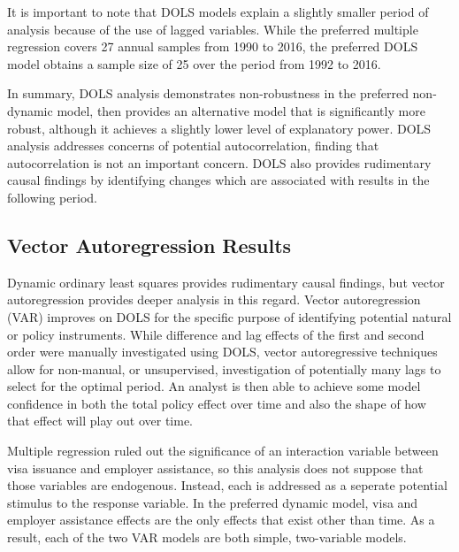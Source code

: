 \documentclass[review]{elsarticle}
\begin{document}
    It is important to note that DOLS models explain a slightly smaller period of analysis because of the use of lagged variables.
    While the preferred multiple regression covers 27 annual samples from 1990 to 2016,
    the preferred DOLS model obtains a sample size of 25 over the period from 1992 to 2016.

    In summary, DOLS analysis demonstrates non-robustness in the preferred non-dynamic model,
    then provides an alternative model that is significantly more robust, although it
    achieves a slightly lower level of explanatory power.
    DOLS analysis addresses concerns of potential autocorrelation,
    finding that autocorrelation is not an important concern.
    DOLS also provides rudimentary causal findings by identifying changes which are associated with results in the following period.

    \subsection{Vector Autoregression Results}

    Dynamic ordinary least squares provides rudimentary causal findings,
    but vector autoregression provides deeper analysis in this regard.
    Vector autoregression (VAR) improves on DOLS for the specific purpose
    of identifying potential natural or policy instruments.
    While difference and lag effects of the first and second order were manually investigated using DOLS,
    vector autoregressive techniques allow for non-manual, or unsupervised,
    investigation of potentially many lags to select for the optimal period.
    An analyst is then able to achieve some model confidence in both the total policy effect over time
    and also the shape of how that effect will play out over time.
    
    Multiple regression ruled out the significance of an interaction variable between
    visa issuance and employer assistance,
    so this analysis does not suppose that those variables are endogenous.
    Instead, each is addressed as a seperate potential stimulus to the response variable.
    In the preferred dynamic model, visa and employer assistance effects
    are the only effects that exist other than time.
    As a result, each of the two VAR models are both simple, two-variable models.
\end{document}
